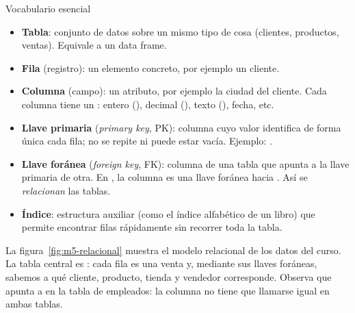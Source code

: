 \begin{concepto}{Vocabulario esencial}
\begin{itemize}
  \item \textbf{Tabla}: conjunto de datos sobre un mismo tipo de cosa
        (clientes, productos, ventas). Equivale a un data frame.
  \item \textbf{Fila} (registro): un elemento concreto, por ejemplo un
        cliente.
  \item \textbf{Columna} (campo): un atributo, por ejemplo la ciudad del
        cliente. Cada columna tiene un : entero
        (), decimal (), texto (),
        fecha, etc.
  \item \textbf{Llave primaria} (\emph{primary key}, PK): columna cuyo valor
        identifica de forma única cada fila; no se repite ni puede estar
        vacía. Ejemplo: .
  \item \textbf{Llave foránea} (\emph{foreign key}, FK): columna de una
        tabla que apunta a la llave primaria de otra. En
        , la columna  es una llave
        foránea hacia . Así se \emph{relacionan} las tablas.
  \item \textbf{Índice}: estructura auxiliar (como el índice alfabético de
        un libro) que permite encontrar filas rápidamente sin recorrer toda
        la tabla.
\end{itemize}
\end{concepto}

La figura~\ref{fig:m5-relacional} muestra el modelo relacional de los datos
del curso. La tabla central es : cada fila es una venta
y, mediante sus llaves foráneas, sabemos a qué cliente, producto, tienda y
vendedor corresponde. Observa que  apunta a
 en la tabla de empleados: la columna no tiene que
llamarse igual en ambas tablas.


